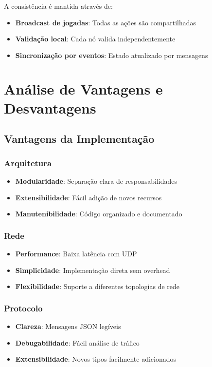 \documentclass[12pt,a4paper]{article}
\begin{document}
A consistência é mantida através de:

\begin{itemize}
    \item \textbf{Broadcast de jogadas}: Todas as ações são compartilhadas
    \item \textbf{Validação local}: Cada nó valida independentemente
    \item \textbf{Sincronização por eventos}: Estado atualizado por mensagens
\end{itemize}

\section{Análise de Vantagens e Desvantagens}

\subsection{Vantagens da Implementação}

\subsubsection{Arquitetura}
\begin{itemize}
    \item \textbf{Modularidade}: Separação clara de responsabilidades
    \item \textbf{Extensibilidade}: Fácil adição de novos recursos
    \item \textbf{Manutenibilidade}: Código organizado e documentado
\end{itemize}

\subsubsection{Rede}
\begin{itemize}
    \item \textbf{Performance}: Baixa latência com UDP
    \item \textbf{Simplicidade}: Implementação direta sem overhead
    \item \textbf{Flexibilidade}: Suporte a diferentes topologias de rede
\end{itemize}

\subsubsection{Protocolo}
\begin{itemize}
    \item \textbf{Clareza}: Mensagens JSON legíveis
    \item \textbf{Debugabilidade}: Fácil análise de tráfico
    \item \textbf{Extensibilidade}: Novos tipos facilmente adicionados
\end{itemize}
\end{document}
